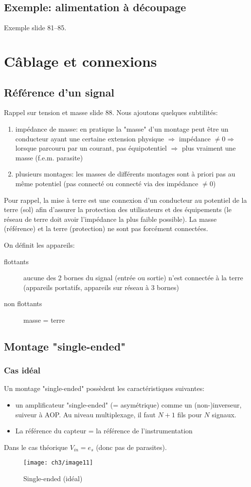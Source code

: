 \subsection{Exemple: alimentation à découpage}
Exemple slide 81--85.\fi
\section{Câblage et connexions}
\subsection{Référence d'un signal}
Rappel sur tension et masse slide 88. Nous ajoutons quelques subtilités:
\begin{enumerate}
	\item impédance de masse: en pratique la "masse" d'un montage peut être un conducteur ayant une certaine extension physique \(\Rightarrow\) impédance \(\neq 0 \Rightarrow\) lorsque parcouru par un courant, pas équipotentiel \(\Rightarrow\) plus vraiment une masse (f.e.m. parasite)
	\item plusieurs montages: les masses de différents montages sont à priori pas au même potentiel (pas connecté ou connecté via des impédance \(\neq 0\))
\end{enumerate}
Pour rappel, la mise à terre est une connexion d'un conducteur au potentiel de la terre (sol) afin d'assurer la protection des utilisateurs et des équipements (le réseau de terre doit avoir l'impédance la plus faible possible). La masse (référence) et la terre (protection) ne sont pas forcément connectées.\bigbreak

On définit les appareils:
\begin{description}
	\item[flottants] aucune des 2 bornes du signal (entrée ou sortie) n'est connectée à la terre (appareils portatifs, appareils sur réseau à 3 bornes)
	\item[non flottants] masse = terre
\end{description}
\subsection{Montage "single-ended"}
\subsubsection{Cas idéal}
Un montage "single-ended" possèdent les caractéristiques suivantes:
\begin{itemize}
\item un amplificateur "single-ended" (= asymétrique) comme un (non-)inverseur, suiveur à AOP. Au niveau multiplexage, il faut \(N+1\) fils pour \(N\) signaux. \item La référence du capteur = la référence de l'instrumentation
\end{itemize} 
Dans le cas théorique \(V_{in}=e_s\) (donc pas de parasites).
\begin{figure}[H] 
	\centering 
	\texttt{[image: ch3/image11]} 
	\caption{Single-ended (idéal)} 
\end{figure}
